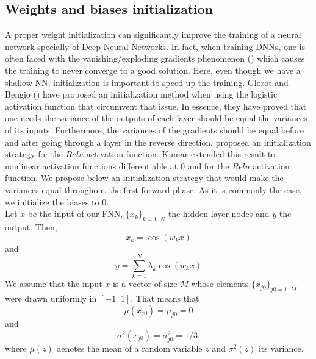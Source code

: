 \documentclass[11pt]{article}
\begin{document}
\subsection{Weights and biases initialization}
A proper weight initialization can significantly improve the training of a neural network specially of Deep Neural Networks. In fact, when training DNNs, one is often faced with the vanishing/exploding gradients phenomenon (\cite{Geron}) which causes the training to never converge to a good solution. Here, even though we have a shallow NN, initialization is important to speed up the training. Glorot and Bengio (\cite{Glorot}) have proposed an initialization method when using the logistic activation function that circumvent that issue. In essence, they have proved that one needs the variance of the outputs of each layer should be equal the variances of its inputs. Furthermore, the variances of the gradients should be equal before and after going through a layer in the reverse direction. \cite{Heinit} proposed an initialization strategy for the $Relu$ activation function. Kumar \cite{Kumar} extended this result to nonlinear activation functions differentiable at $0$ and for the $Relu$ activation function. We propose below an initialization strategy that would make the variances equal throughout the first forward phase. As it is commonly the case, we initialize the biases to $0$. \\
Let $x$ be the input of our FNN, $\{x_k\}_{k = 1..N}$ the hidden layer nodes and $y$ the output. Then, 
$$
x_k = \cos(w_k x )
$$
and
$$
y = \sum_{k = 1}^N \lambda_k \cos(w_k x  ) 
$$
 We assume that the input $x$ is a vector of size $M$ whose elements $\{x_{j0}\}_{j0 = 1..M}$ were drawn uniformly in $[-1 \;\; 1]$. That means that $$\mu(x_{j0}) = \mu_{j0} = 0$$ and $$\sigma^2(x_{j0}) = \sigma^2_{j0} = 1/3. $$ where $\mu(z)$ denotes the mean of a random variable $z$ and $\sigma^2(z)$ its variance. 
\end{document}
